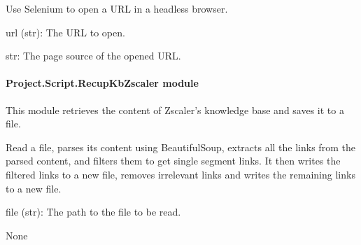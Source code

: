 \documentclass[letterpaper,10pt,english]{sphinxmanual}
\begin{document}

\begin{fulllineitems}
\label{\detokenize{Project.Script:Project.Script.RecupKbPaloAlto.selenium}}
\pysigstartsignatures
{}
\pysigstopsignatures
\sphinxAtStartPar
Use Selenium to open a URL in a headless browser.
\begin{description}
\sphinxAtStartPar
url (str): The URL to open.

\sphinxAtStartPar
str: The page source of the opened URL.

\end{description}

\end{fulllineitems}



\paragraph{Project.Script.RecupKbZscaler module}
\label{\detokenize{Project.Script:module-Project.Script.RecupKbZscaler}}\label{\detokenize{Project.Script:project-script-recupkbzscaler-module}}
\sphinxAtStartPar
This module retrieves the content of Zscaler’s knowledge base and saves it to a file.

\begin{fulllineitems}
\label{\detokenize{Project.Script:Project.Script.RecupKbZscaler.getAllCategory}}
\pysigstartsignatures
{}
\pysigstopsignatures
\sphinxAtStartPar
Read a file, parses its content using BeautifulSoup, extracts all the links from the parsed content, and filters them to get single segment links. It then writes the filtered links to a new file, removes irrelevant links and writes the remaining links to a new file.
\begin{description}
\sphinxAtStartPar
file (str): The path to the file to be read.

\sphinxAtStartPar
None

\end{description}

\end{fulllineitems}
\end{document}
